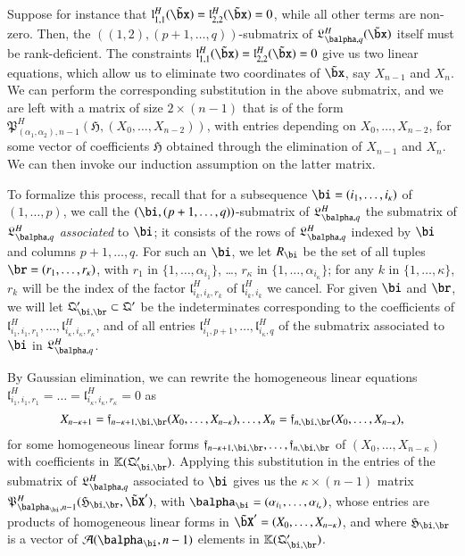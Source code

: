\documentclass[amsthm]{elsart}
\begin{document}
Suppose for instance that
$\mathfrak{l}^H_{1,1}(\tilde\bx)=\mathfrak{l}^H_{2,2}(\tilde\bx)=0$,
while all other terms are non-zero. Then, the
$((1,2),(p+1,\dots,q))$-submatrix of
${\mathfrak{L}^H_{\balpha,q}}(\tilde\bx)$ itself must be
rank-deficient.  The constraints
$\mathfrak{l}^H_{1,1}(\tilde\bx)=\mathfrak{l}^H_{2,2}(\tilde\bx)=0$
give us two linear equations, which allow us to eliminate two
coordinates of $\tilde\bx$, say $X_{n-1}$ and $X_n$. We can perform
the corresponding substitution in the above submatrix, and we are left
with a matrix of size $2 \times (n-1)$ that is of the form
$\mathfrak{P}^H_{(\alpha_1,\alpha_2),n-1}(\mathfrak{H},(X_0,\dots,X_{n-2}))$,
with entries depending on $X_0,\dots,X_{n-2}$, for some vector of
coefficients $\mathfrak{H}$ obtained through the elimination of
$X_{n-1}$ and $X_n$. We can then invoke our induction assumption on
the latter matrix.

To formalize this process, recall that for a subsequence
$\bi=(i_1,\dots,i_\kappa)$ of $(1,\dots,p)$, we call the
$(\bi,(p+1,\dots,q))$-submatrix of $\mathfrak{L}^H_{\balpha,q}$ the submatrix of
$\mathfrak{L}^H_{\balpha,q}$ {\em associated} to $\bi$; it consists of the rows of
$\mathfrak{L}^H_{\balpha,q}$ indexed by $\bi$ and columns $p+1,\dots,q$.
For such an $\bi$, we let $R_\bi$ be the set of
all tuples $\br=(r_1,\dots,r_\kappa)$, with $r_1$ in
$\{1,\dots,\alpha_{i_1}\}$, \dots, $r_\kappa$ in
$\{1,\dots,\alpha_{i_\kappa}\}$; for any $k$ in $\{1,\dots,\kappa\}$,
$r_k$ will be the index of the factor $\mathfrak{l}^H_{i_k,i_k,r_k}$
of $\mathfrak{l}^H_{i_k,i_k}$ we cancel. For given $\bi$ and $\br$,
we will let $\mathfrak{Q}'_{\bi,\br} \subset \mathfrak{Q}'$ be the
indeterminates corresponding to the coefficients of
$\mathfrak{l}^H_{i_1,i_1,r_1},\dots,\mathfrak{l}^H_{i_\kappa,i_\kappa,r_\kappa}$, and
of all entries $\mathfrak{l}^H_{i_1,p+1},\dots,\mathfrak{l}^H_{i_\kappa,q}$
of the submatrix associated to $\bi$ in $\mathfrak{L}^H_{\balpha,q}$.

By Gaussian elimination, we can rewrite the homogeneous linear
equations
$\mathfrak{l}^H_{i_1,i_1,r_1}=\dots=\mathfrak{l}^H_{i_\kappa,i_\kappa,r_\kappa}=0$ as
\begin{align}\label{eq:f_sr}
X_{n-\kappa+1}=\mathfrak{f}_{n-\kappa+1,\bi,\br}(X_0,\dots,X_{n-\kappa}),\dots,X_{n}=\mathfrak{f}_{n,\bi,\br}(X_0,\dots,X_{n-\kappa}),  
\end{align}
for some homogeneous linear forms
$\mathfrak{f}_{n-\kappa+1,\bi,\br},\dots,\mathfrak{f}_{n,\bi,\br}$ of
$(X_0,\dots,X_{n-\kappa})$ with coefficients in
$\KK(\mathfrak{Q}'_{\bi,\br})$. Applying this substitution in the
entries of the submatrix of ${\mathfrak{L}^H_{\balpha,q}}$ associated
to $\bi$ gives us the $\kappa \times (n-1)$ matrix
$\mathfrak{P}^H_{\balpha_\bi,n-1}(\mathfrak{H}_{\bi,\br},\tilde\bX')$,
with $\balpha_\bi=(\alpha_{i_1},\dots,\alpha_{i_\kappa})$, whose
entries are products of homogeneous linear forms in
$\tilde\bX'=(X_0,\dots,X_{n-\kappa})$, and where $\mathfrak{H}_{\bi,\br}$ is a
vector of ${\cal A}(\balpha_\bi,n-1)$ elements in $\KK(\mathfrak{Q}'_{\bi,\br})$.
\end{document}
